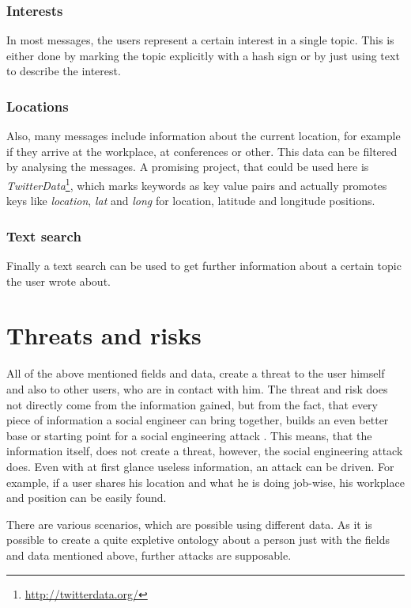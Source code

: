 \subsubsection{Interests}

In most messages, the users represent a certain interest in a single topic.
This is either done by marking the topic explicitly with a hash sign or by just
using text to describe the interest. 

\subsubsection{Locations}

Also, many messages include information about the current location, for example
if they arrive at the workplace, at conferences or other. This data can be
filtered by analysing the messages. A promising project, that could be used
here is \textit{TwitterData}\footnote{\url{http://twitterdata.org/}}, which
marks keywords as key value pairs and actually promotes keys like
\textit{location}, \textit{lat} and \textit{long} for location, latitude and longitude
positions.

\subsubsection{Text search}

Finally a text search can be used to get further information about a certain
topic the user wrote about. 

\section{Threats and risks}

All of the above mentioned fields and data, create a threat to the user himself
and also to other users, who are in contact with him. The threat and risk does
not directly come from the information gained, but from the fact, that every
piece of information a social engineer can bring together, builds an even
better base or starting point for a social engineering attack
\cite{mitnick2003}. This means, that the information itself, does not create a
threat, however, the social engineering attack does. Even with at first glance
useless information, an attack can be driven. For example, if a user shares his
location and what he is doing job-wise, his workplace and position can be
easily found.

There are various scenarios, which are possible using different data. As it is
possible to create a quite expletive ontology about a person just with the
fields and data mentioned above, further attacks are supposable.

